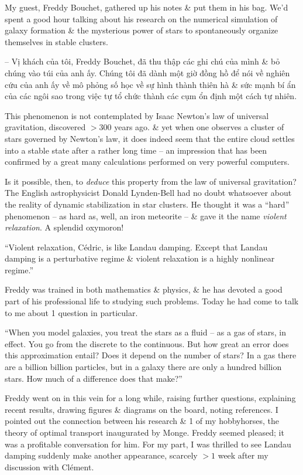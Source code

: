 \documentclass{article}
\begin{document}
\begin{enumerate}
	My guest, {\sc Freddy Bouchet}, gathered up his notes \& put them in his bag. We'd spent a good hour talking about his research on the numerical simulation of galaxy formation \& the mysterious power of stars to spontaneously organize themselves in stable clusters.
	
	-- Vị khách của tôi, {\sc Freddy Bouchet}, đã thu thập các ghi chú của mình \& bỏ chúng vào túi của anh ấy. Chúng tôi đã dành một giờ đồng hồ để nói về nghiên cứu của anh ấy về mô phỏng số học về sự hình thành thiên hà \& sức mạnh bí ẩn của các ngôi sao trong việc tự tổ chức thành các cụm ổn định một cách tự nhiên.
	
	This phenomenon is not contemplated by {\sc Isaac Newton}'s law of universal gravitation, discovered $> 300$ years ago. \& yet when one observes a cluster of stars governed by {\sc Newton}'s law, it does indeed seem that the entire cloud settles into a stable state after a rather long time -- an impression that has been confirmed by a great many calculations performed on very powerful computers.
	
	Is it possible, then, to {\it deduce} this property from the law of universal gravitation? The English astrophysicist {\sc Donald Lynden-Bell} had no doubt whatsoever about the reality of dynamic stabilization in star clusters. He thought it was a ``hard'' phenomenon -- as hard as, well, an iron meteorite -- \& gave it the name {\it violent relaxation}. A splendid oxymoron!
	
	``Violent relaxation, C\'edric, is like Landau damping. Except that Landau damping is a perturbative regime \& violent relaxation is a highly nonlinear regime.''
	
	{\sc Freddy} was trained in both mathematics \& physics, \& he has devoted a good part of his professional life to studying such problems. Today he had come to talk to me about 1 question in particular.
	
	``When you model galaxies, you treat the stars as a fluid -- as a gas of stars, in effect. You go from the discrete to the continuous. But how great an error does this approximation entail? Does it depend on the number of stars? In a gas there are a billion billion particles, but in a galaxy there are only a hundred billion stars. How much of a difference does that make?''
	
	{\sc Freddy} went on in this vein for a long while, raising further questions, explaining recent results, drawing figures \& diagrams on the board, noting references. I pointed out the connection between his research \& 1 of my hobbyhorses, the theory of optimal transport inaugurated by {\sc Monge}. {\sc Freddy} seemed pleased; it was a profitable conversation for him. For my part, I was thrilled to see Landau damping suddenly make another appearance, scarcely $> 1$ week after my discussion with Cl\'ement.
	

\end{enumerate}
\end{document}
